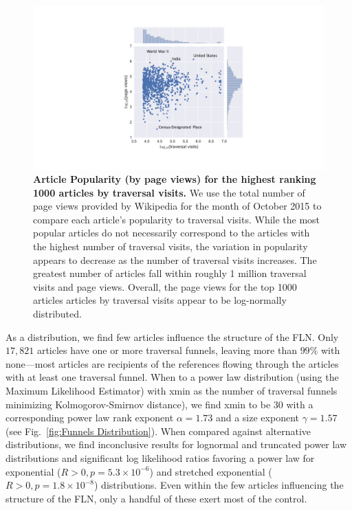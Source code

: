 \documentclass[pre,twocolumn,twoside,superscriptaddress,floatfix, aps, 10pt]{revtex4-1}
\begin{document}
\begin{figure}[tp!]
  \includegraphics[width=\columnwidth]{graphics/popularity_visits.pdf}
  \caption{
\textbf{Article Popularity (by page views) for the highest ranking 1000 articles by traversal visits.}
We use the total number of page views provided by Wikipedia for the month
of October 2015 to compare each article's popularity to traversal visits.
While the most popular articles do not necessarily correspond to the articles
with the highest number of traversal visits, the variation in popularity appears to decrease as the number of traversal visits increases. The greatest number of articles fall within roughly 1 million traversal visits and page views. Overall, the page views for the top 1000 articles articles by traversal visits appear to be log-normally distributed. 
}
  \label{fig:Views and Visits}

\end{figure}
As a distribution, we find few articles influence the structure of the 
FLN. Only $17, 821$ articles have one or more traversal funnels, leaving
more than $99\%$ with none---most articles are recipients of 
the references flowing through the articles with at least one traversal funnel.
When to a power law 
    distribution (using the Maximum Likelihood Estimator) with xmin as the number of traversal funnels minimizing Kolmogorov-Smirnov distance), we find xmin to be 30 with a corresponding power law rank exponent $\alpha = 1.73$ and a size exponent $\gamma = 1.57$
(see Fig.~\ref{fig:Funnels Distribution}). 
When compared against alternative distributions, we find inconclusive results for lognormal and truncated power law distributions and significant log likelihood ratios favoring a power law for exponential ($R>0, p=5.3\times10^{-6}$) and stretched exponential ($R>0, p = 1.8\times10^{-8}$) distributions.
Even within the few articles
influencing the structure of the FLN, only a handful of these exert most of the 
control. 
\end{document}
